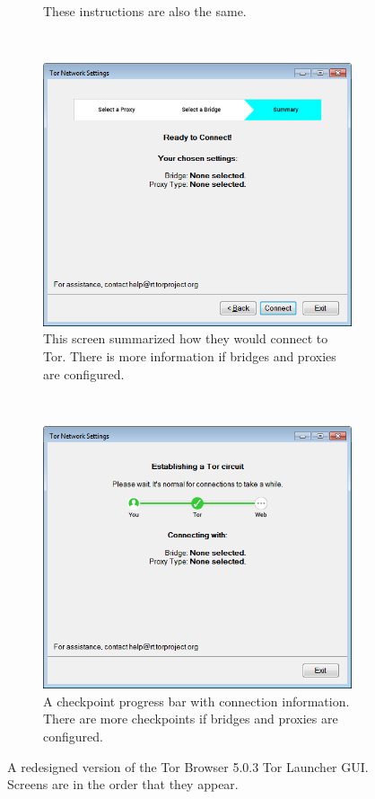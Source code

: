 \documentclass[USenglish,oneside,twocolumn]{article}
\begin{document}
\begin{figure}
\begin{subfigure}[b]{0.30\textwidth}
	\caption{These instructions are also the same.}
	\label{fig:new-bridge-help}
\end{subfigure}
~~~~~~~~~~
\begin{subfigure}[b]{0.30\textwidth}
	\includegraphics[width=\textwidth]{screenshots/NEW-summary.png}
	\caption{This screen summarized how they would connect to Tor. There is more information if bridges and proxies are configured.}
	\label{fig:new-summary}
\end{subfigure}
~~~~~~~~~~
\begin{subfigure}[b]{0.35\textwidth}
	\includegraphics[width=\textwidth]{screenshots/NEW-progress.png}
	\caption{A checkpoint progress bar with connection information. There are more checkpoints if bridges and proxies are configured.}
	\label{fig:new-progress}
\end{subfigure}
\caption{
A redesigned version of the Tor Browser 5.0.3 Tor Launcher GUI. Screens are in the order that they appear. 
}
\label{fig:new-interface}
\end{figure} 
\end{document}

